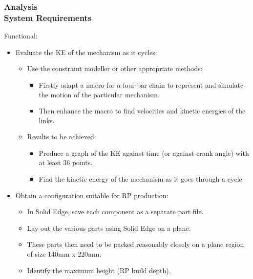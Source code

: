\documentclass[ucs,10pt]{beamer}
\begin{document}
\begin{frame}
\frametitle{Analysis \\
    \small \color{rwth-blue} System Requirements}
    Functional:
    \begin{itemize}
        \item Evaluate the KE of the mechanism as it cycles:
        \begin{itemize}
            \item Use the constraint modeller or other appropriate methods:
            \begin{itemize}
                \item Firstly adapt a macro for a four-bar chain to represent and simulate the motion of the particular mechanism.
                \item Then enhance the macro to find velocities and kinetic energies of the links.
            \end{itemize}
            \item Results to be achieved:
            \begin{itemize}
                \item Produce a graph of the KE against time (or against crank angle) with at least 36 points.
                \item Find the kinetic energy of the mechanism as it goes through a cycle.
            \end{itemize}
        \end{itemize}
        \item Obtain a configuration suitable for RP production:
        \begin{itemize}
            \item In Solid Edge, save each component as a separate part file.
            \item Lay out the various parts using Solid Edge on a plane.
            \item These parts then need to be packed reasonably closely on a plane region of size 140mm x 220mm.
            \item Identify the maximum height (RP build depth).
        \end{itemize}
    \end{itemize}
\end{frame}
\end{document}

